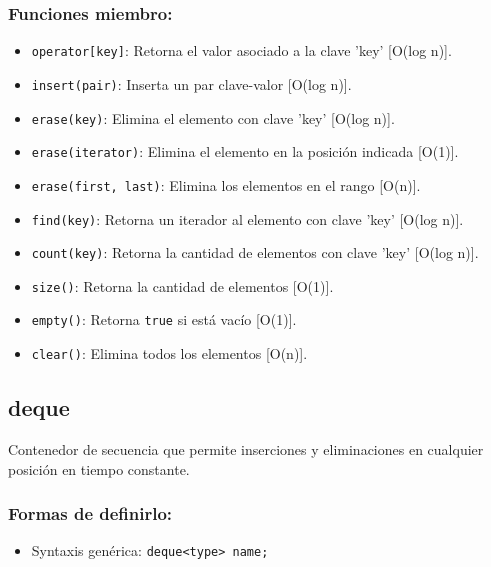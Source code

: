 \subsubsection{Funciones miembro:}
\begin{itemize}
  \item \texttt{operator[key]}: Retorna el valor asociado a la clave 'key' [O(log n)].
  \item \texttt{insert(pair)}: Inserta un par clave-valor [O(log n)]. 
  \item \texttt{erase(key)}: Elimina el elemento con clave 'key' [O(log n)].
  \item \texttt{erase(iterator)}: Elimina el elemento en la posición indicada [O(1)].
  \item \texttt{erase(first, last)}: Elimina los elementos en el rango [O(n)].
  \item \texttt{find(key)}: Retorna un iterador al elemento con clave 'key' [O(log n)]. 
  \item \texttt{count(key)}: Retorna la cantidad de elementos con clave 'key' [O(log n)]. 
  \item \texttt{size()}: Retorna la cantidad de elementos [O(1)]. 
  \item \texttt{empty()}: Retorna \texttt{true} si está vacío [O(1)]. 
  \item \texttt{clear()}: Elimina todos los elementos [O(n)]. 
\end{itemize}

\subsection{deque}
\label{subsec:std_deque}
Contenedor de secuencia que permite inserciones y eliminaciones en cualquier posición en tiempo constante.

\subsubsection{Formas de definirlo:}
\begin{itemize}
  \item Syntaxis genérica: \texttt{deque<type> name;}
\end{itemize}

